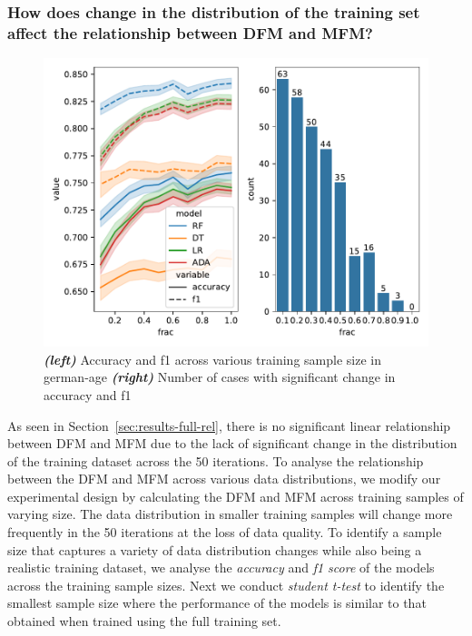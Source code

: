 \documentclass{article}
\begin{document}
\subsubsection{How does change in the distribution of the training set
  affect the relationship between DFM and MFM?}\label{sec:results-full-rel-dist}

\begin{figure}
  \centering
  \includegraphics[width=0.95\linewidth]{training-set-frac-threshold.pdf}
  \caption{\emph{\textbf{(left)}} Accuracy and f1 across various
    training sample size in german-age \emph{\textbf{(right)}} Number
    of cases with significant change in accuracy and f1}
  \label{fig:training-set-frac-threshold}
\end{figure}

As seen in Section \ref{sec:results-full-rel}, there is no significant
linear relationship between DFM and MFM due to the lack of significant
change in the distribution of the training dataset across the 50
iterations. To analyse the relationship between the DFM and MFM across
various data distributions, we modify our experimental design by
calculating the DFM and MFM across training samples of varying size.
The data distribution in smaller training samples will change more
frequently in the 50 iterations at the loss of data quality. To
identify a sample size that captures a variety of data distribution
changes while also being a realistic training dataset, we analyse the
\emph{accuracy} and \emph{f1 score} of the models across the training
sample sizes. Next we conduct \emph{student t-test} to identify the
smallest sample size where the performance of the models is similar to
that obtained when trained using the full training set.
\end{document}
